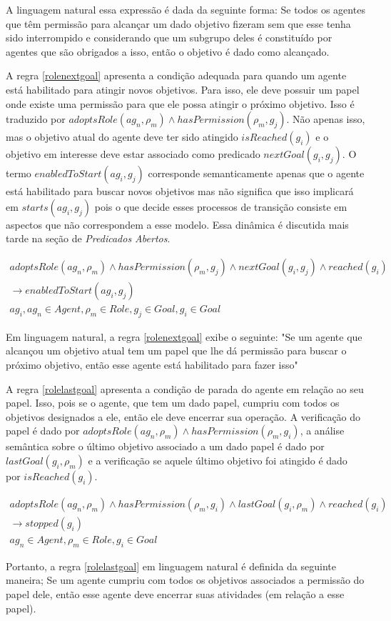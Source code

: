 A linguagem natural essa expressão é dada da seguinte forma: Se todos os agentes que têm permissão para alcançar um dado objetivo fizeram sem que esse tenha sido interrompido e considerando que um subgrupo deles é constituído por agentes que são obrigados a isso, então o objetivo é dado como alcançado.

A regra \ref{rolenextgoal} apresenta a condição adequada para quando um agente está habilitado para atingir novos objetivos. Para isso, ele deve possuir um papel onde existe uma permissão para que ele possa atingir o próximo objetivo. Isso é traduzido por $ adoptsRole(ag_n,\rho_m) \wedge hasPermission(\rho_m,g_j) $. Não apenas isso, mas o objetivo atual do agente deve ter sido atingido $ isReached(g_i) $ e o objetivo em interesse deve estar associado como predicado $nextGoal(g_i,g_j)$. O termo $enabledToStart(ag_i,g_j)$ corresponde semanticamente apenas que o agente está habilitado para buscar novos objetivos mas não significa que isso implicará em $starts(ag_i,g_j)$ pois o que decide esses processos de transição consiste em aspectos que não correspondem a esse modelo. Essa dinâmica é discutida mais tarde na seção de \textit{Predicados Abertos}.

\begin{eqnarray}\label{rolenextgoal}
	adoptsRole(ag_n,\rho_m) \wedge hasPermission(\rho_m,g_j) \wedge nextGoal(g_i,g_j) \wedge reached(g_i) \nonumber \\
	\to enabledToStart(ag_i,g_j) \nonumber \\
    ag_i, ag_n \in Agent, \rho_m \in Role, g_j \in Goal, g_i \in Goal
\end{eqnarray}

Em linguagem natural, a regra \ref{rolenextgoal} exibe o seguinte: "Se um agente que alcançou um objetivo atual tem um papel que lhe dá permissão para buscar o próximo objetivo, então esse agente está habilitado para fazer isso"

A regra \ref{rolelastgoal} apresenta a condição de parada do agente em relação ao seu papel. Isso, pois se o agente, que tem um dado papel,
cumpriu com todos os objetivos designados a ele, então ele deve encerrar sua operação. A verificação do papel é dado por $adoptsRole(ag_n,\rho_m) \wedge hasPermission(\rho_m,g_i)$, a análise semântica sobre o último objetivo associado a um dado papel é dado por $lastGoal(g_i,\rho_m)$ e a verificação se aquele último objetivo foi atingido é dado por $isReached(g_i)$. 

\begin{eqnarray}\label{rolelastgoal}
	adoptsRole(ag_n,\rho_m) \wedge hasPermission(\rho_m,g_i) \wedge lastGoal(g_i,\rho_m) \wedge reached(g_i) \nonumber \\
	\to stopped(g_i) \nonumber \\
    ag_n \in Agent, \rho_m \in Role, g_i \in Goal
\end{eqnarray}

Portanto, a regra \ref{rolelastgoal} em linguagem natural é definida da seguinte maneira; Se um agente cumpriu com todos os objetivos associados a permissão do papel dele, então esse agente deve encerrar suas atividades (em relação a esse papel). 

